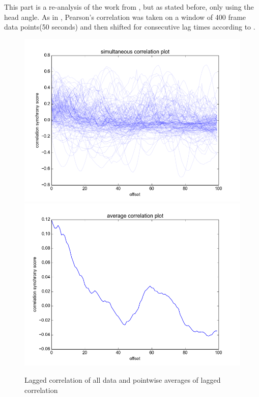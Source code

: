 \documentclass[12pt]{article}
\begin{document}
This part is a re-analysis of the work from \cite{andrea}, but as stated before, only using the head angle. As in \cite{andrea}, Pearson's correlation was taken on a window of 400 frame data points(50 seconds) and then shifted for consecutive lag times according to \cite{framedifferencing}.

\begin{figure}\label{fig:lag_correlation}
  \begin{center}
    \includegraphics[scale=0.6]{correlation_mc}
    \includegraphics[scale=0.6]{correlation_summary}
  \end{center}
  \caption{Lagged correlation of all data and pointwise averages of lagged correlation}
\end{figure}
\end{document}
